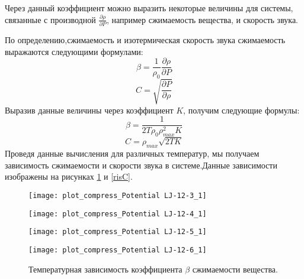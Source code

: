 Через данный коэффициент можно выразить некоторые величины для системы, связанные с производной $\frac{\partial \rho}{\partial P}$, например сжимаемость вещества, и скорость звука.

По определению,сжимаемость и изотермическая скорость звука сжимаемость выражаются следующими формулами:
\begin{equation}
\beta = \frac{1}{\rho_0} \frac{\partial \rho}{\partial P}
\label{eqBetaClassic}
\end{equation}
\begin{equation}
C = \sqrt{\frac{\partial P}{\partial \rho}}
\label{eqCClassic}
\end{equation}
Выразив данные величины через коэффициент $K$, получим следующие формулы:
\begin{equation}
\beta = \frac{1}{2T\rho_0\rho_{max}^2K}
\label{eqBeta}
\end{equation}
\begin{equation}
C = \rho_{max}\sqrt{2TK}
\label{eqC}
\end{equation}
Проведя данные вычисления для различных температур, мы получаем зависимость сжимаемости и скорости звука в системе.Данные зависимости изображены на рисунках \ref{risBeta} и \ref{risC}.


\begin{figure}[h]
\begin{center}
\begin{minipage}[h]{0.45\linewidth}
\texttt{[image: plot\_compress\_Potential LJ-12-3\_1]}
\end{minipage}
\begin{minipage}[h]{0.45\linewidth}
\texttt{[image: plot\_compress\_Potential LJ-12-4\_1]}
\end{minipage}


\begin{minipage}[h]{0.45\linewidth}
\texttt{[image: plot\_compress\_Potential LJ-12-5\_1]}
\end{minipage}
\begin{minipage}[h]{0.45\linewidth}
\texttt{[image: plot\_compress\_Potential LJ-12-6\_1]}
\end{minipage}
\caption{Температурная зависимость коэффициента $\beta$ сжимаемости вещества.}
\label{risBeta}
\end{center}
\end{figure}


